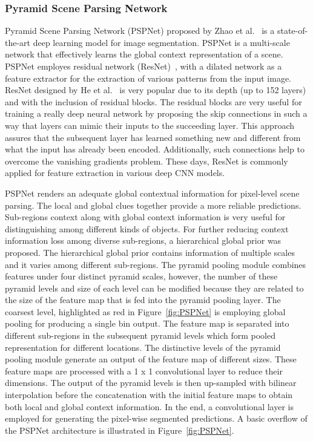 \subsubsection{Pyramid Scene Parsing Network}
	Pyramid Scene Parsing Network (PSPNet) proposed by Zhao et al.~\cite{zhao2017pyramid} is a state-of-the-art deep learning model for image segmentation. PSPNet is a multi-scale network that effectively learns the global context representation of a scene. PSPNet employes residual network (ResNet)~\cite{he2016deep}, with a dilated network as a feature extractor for the extraction of various patterns from the input image. ResNet designed by He et al.~\cite{he2016deep} is very popular due to its depth (up to 152 layers) and with the inclusion of residual blocks. The residual blocks are very useful for training a really deep neural network by proposing the skip connections in such a way that layers can mimic their inputs to the succeeding layer. 
	This approach assures that the subsequent layer has learned something new and different from what the input has already been encoded. Additionally, such connections help to overcome the vanishing gradients problem. These days, ResNet is commonly applied for feature extraction in various deep CNN models. 
	
	PSPNet renders an adequate global contextual information for pixel-level scene parsing. The local and global clues together provide a more reliable predictions. Sub-regions context along with global context information is very useful for distinguishing among different kinds of objects. For further reducing context information loss among diverse sub-regions, a hierarchical global prior was proposed. The hierarchical global prior contains information of multiple scales and it varies among different sub-regions. The pyramid pooling module combines features under four distinct pyramid scales, however, the number of these pyramid levels and size of each level can be modified because they are related to the size of the feature map that is fed into the pyramid pooling layer. The coarsest level, highlighted as red in Figure~\ref{fig:PSPNet} is employing global pooling for producing a single bin output. The feature map is separated into different sub-regions in the subsequent pyramid levels which form pooled representation for different locations. The distinctive levels of the pyramid pooling module generate an output of the feature map of different sizes. These feature maps are processed with a 1 x 1 convolutional layer to reduce their dimensions. The output of the pyramid levels is then up-sampled with bilinear interpolation before the concatenation with the initial feature maps to obtain both local and global context information. In the end, a convolutional layer is employed for generating the pixel-wise segmented predictions. A basic overflow of the PSPNet architecture is illustrated in Figure~\ref{fig:PSPNet}. 
	
